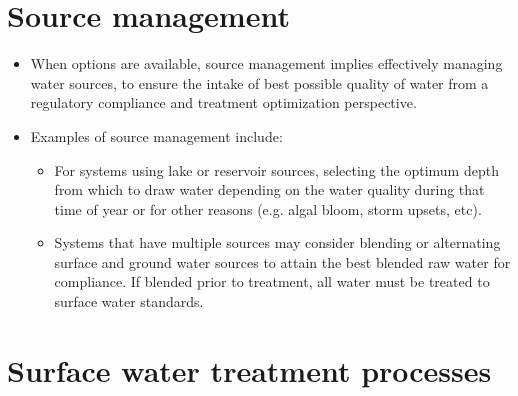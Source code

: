 \begin{itemize}
\begin{enumerate}
\begin{itemize}
\end{itemize}



\end{enumerate}
\vspace{1cm}

\section{Source management}
\begin{itemize}
\item When options are available, source management implies effectively managing water sources, to ensure the intake of best possible quality of water from a regulatory compliance and treatment optimization perspective.
\item Examples of source management include:
\begin{itemize}
\item For systems using lake or reservoir sources, selecting the optimum depth from which to draw water depending on the water quality during that time of year or for other reasons (e.g. algal bloom,
storm upsets, etc).
\item Systems that have multiple sources may consider blending or alternating surface and ground
water sources to attain the best blended raw water for compliance. If blended prior to treatment, all water must be treated to surface water standards.
\end{itemize}
\end{itemize}

\section{Surface water treatment processes}

\end{itemize}
